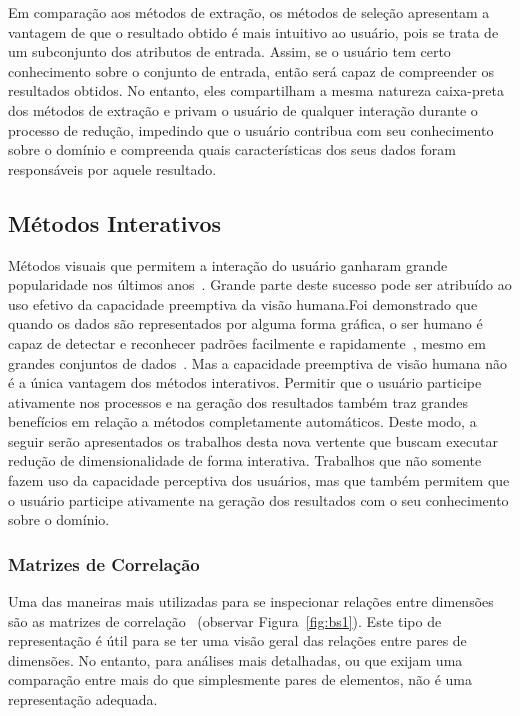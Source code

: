 Em comparação aos métodos de extração, os métodos de seleção apresentam a vantagem de que o resultado obtido é mais intuitivo ao usuário, pois se trata de um subconjunto dos atributos de entrada. 
Assim, se o usuário tem certo conhecimento sobre o conjunto de entrada, então será capaz de compreender os resultados obtidos.
No entanto, eles compartilham a mesma natureza caixa-preta dos métodos de extração e privam o usuário de qualquer interação durante o processo de redução, impedindo que o usuário contribua com seu conhecimento sobre o domínio e compreenda quais características dos seus dados foram responsáveis por aquele resultado.

\subsection{Métodos Interativos}

Métodos visuais que permitem a interação do usuário ganharam grande popularidade nos últimos anos~\cite{State2012}. 
Grande parte deste sucesso pode ser atribuído ao uso efetivo da capacidade preemptiva da visão humana.Foi demonstrado que quando os dados são representados por alguma forma gráfica, o ser humano é capaz de detectar e reconhecer padrões facilmente e rapidamente~\cite{Healey1995}, mesmo em grandes conjuntos de dados~\cite{Fodor2002}. Mas a capacidade preemptiva de visão humana não é a única vantagem dos métodos interativos. Permitir que o usuário participe ativamente nos processos e na geração dos resultados também traz grandes benefícios em relação a métodos completamente automáticos. Deste modo, a seguir serão apresentados os trabalhos desta nova vertente que buscam executar redução de dimensionalidade de forma interativa. Trabalhos que não somente fazem uso da capacidade perceptiva dos usuários, mas que também permitem que o usuário participe ativamente na geração dos resultados com o seu conhecimento sobre o domínio.

\subsubsection{Matrizes de Correlação}

Uma das maneiras mais utilizadas para se inspecionar relações entre dimensões são as matrizes de correlação~\cite{Friendly2002} (observar Figura~\ref{fig:bs1}). Este tipo de representação é útil para se ter uma visão geral das relações entre pares de dimensões. No entanto, para análises mais detalhadas, ou que exijam uma comparação entre mais do que simplesmente pares de elementos, não é uma representação adequada.

